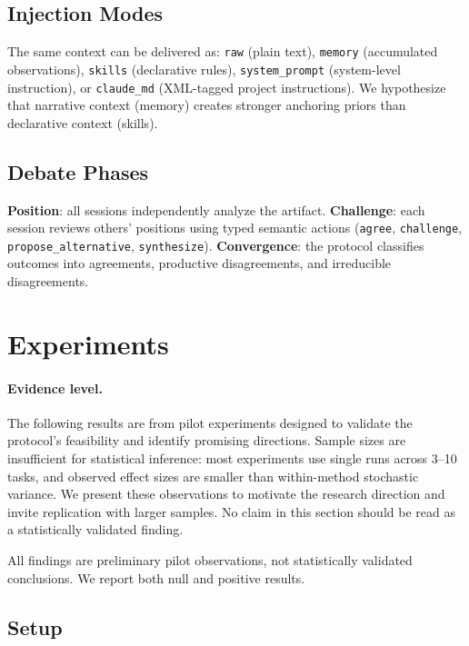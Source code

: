 \documentclass{article}
\begin{document}
\subsection{Injection Modes}

The same context can be delivered as: \texttt{raw} (plain text), \texttt{memory} (accumulated observations), \texttt{skills} (declarative rules), \texttt{system\_prompt} (system-level instruction), or \texttt{claude\_md} (XML-tagged project instructions). We hypothesize that narrative context (memory) creates stronger anchoring priors than declarative context (skills).

\subsection{Debate Phases}

\textbf{Position}: all sessions independently analyze the artifact. \textbf{Challenge}: each session reviews others' positions using typed semantic actions (\texttt{agree}, \texttt{challenge}, \texttt{propose\_alternative}, \texttt{synthesize}). \textbf{Convergence}: the protocol classifies outcomes into agreements, productive disagreements, and irreducible disagreements.

\section{Experiments}
\label{sec:experiments}

\paragraph{Evidence level.} The following results are from pilot experiments designed to validate the protocol's feasibility and identify promising directions. Sample sizes are insufficient for statistical inference: most experiments use single runs across 3--10 tasks, and observed effect sizes are smaller than within-method stochastic variance. We present these observations to motivate the research direction and invite replication with larger samples. No claim in this section should be read as a statistically validated finding.

All findings are preliminary pilot observations, not statistically validated conclusions. We report both null and positive results.

\subsection{Setup}
\label{sec:setup}
\end{document}
